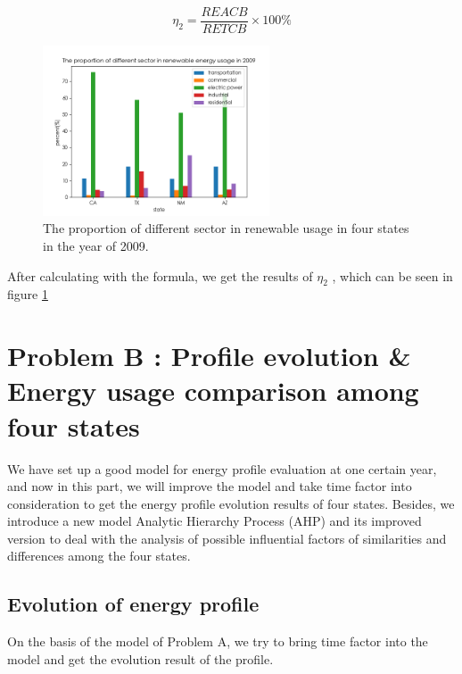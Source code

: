 \documentclass[a4paper,11pt]{article}
\begin{document}
\begin{equation}
    \eta_2=\frac{REACB}{RETCB} \times 100\%
\end{equation}

\begin{figure}[h]%
    \centering 
    \includegraphics[width=0.6\textwidth]{./Pic/1-3.png}
    \caption{The proportion of different sector in renewable usage in four states in the year of 2009.}
    \label{fig:1-3}  
\end{figure}
\par After calculating with the formula, we get the results of $\eta_2$ , which can be seen in figure \ref{fig:1-3}






\section{Problem B : Profile evolution \& Energy usage comparison among four states}


\par We have set up a good model for energy profile evaluation at one certain year, and now in this part, we will improve the model and take time factor into consideration to get the energy profile evolution results of four states. Besides,
we introduce a new model Analytic Hierarchy Process (AHP) and its improved version to deal with the analysis of possible influential factors of similarities and differences among the four states.


\subsection{Evolution of energy profile}
\par On the basis of the model of Problem A, we try to bring time factor into the model and get the evolution result of the profile. 
\end{document}
